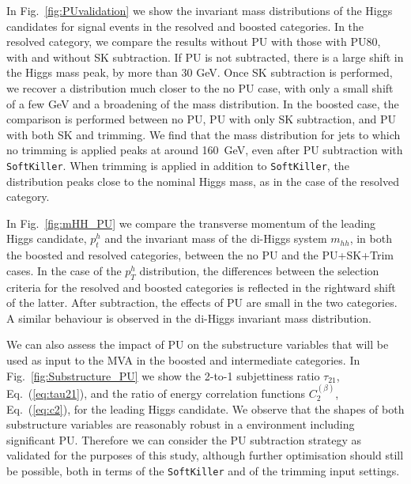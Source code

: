 %
In Fig.~\ref{fig:PUvalidation} we show the
invariant mass distributions of the
Higgs candidates for signal
events in the resolved and boosted categories.
%
 In the resolved category,
    we compare  the results without PU
    with those with PU80, with and without SK subtraction.
    If PU is not subtracted, there is a large shift in the Higgs mass
peak, by more than 30 GeV.
%
Once SK subtraction is performed, we recover a distribution much closer
to the no PU case, with only a small shift of a few GeV
and a broadening of the mass
distribution.
    In the boosted case, the comparison is performed between no PU,
    PU with only SK subtraction,
    and PU with both SK and trimming.
%
We find that
the mass distribution for jets to which no trimming
is applied peaks at around 160~GeV, even
after PU subtraction with {\tt SoftKiller}.
%
When trimming is applied in addition to {\tt SoftKiller}, 
the distribution peaks close to the nominal Higgs mass, as in the case
of the resolved category.


In Fig.~\ref{fig:mHH_PU}
we compare the transverse momentum of the leading Higgs
candidate, $p_t^{h}$ and the invariant mass of the di-Higgs system
$m_{hh}$, in both the boosted and resolved categories,
between the no PU and the PU+SK+Trim cases.
%
In the case of the $p_T^{h}$ distribution, the differences between the selection
criteria for the resolved
and boosted categories is reflected in the rightward shift of the latter.
%
After subtraction,
the effects of PU are small in the two categories.
%
A similar behaviour is observed in the di-Higgs invariant mass distribution.

We can also assess the impact of PU on the
substructure variables that will be 
used as input to the MVA in the boosted
and intermediate categories.
%
In Fig.~\ref{fig:Substructure_PU} we show the 2-to-1 subjettiness ratio
$\tau_{21}$, Eq.~(\ref{eq:tau21}), and the ratio
of energy correlation functions $C_2^{(\beta)}$,
Eq.~(\ref{eq:c2}), for the leading Higgs candidate.
%
We observe that
the shapes of both substructure variables
are reasonably robust in a environment including significant PU.
%
Therefore we can consider the PU subtraction strategy
as validated for the purposes of this study, although
further optimisation should still be possible, both in terms of
the {\tt SoftKiller} and of the trimming
input settings.


